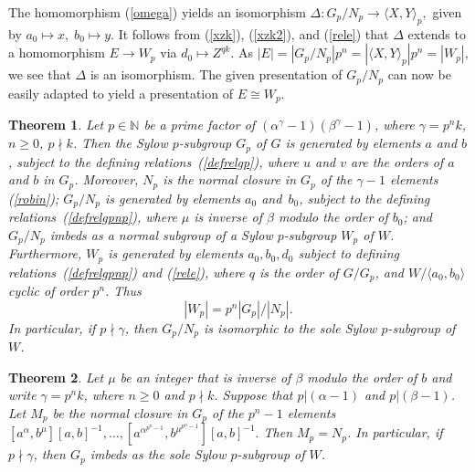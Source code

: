 \documentclass{amsart}
\newtheorem{theorem}{Theorem}[section]
\theoremstyle{definition}
\theoremstyle{remark}
\newcommand \N{{\mathbb N}}
\begin{document}
The homomorphism (\ref{omega}) yields an isomorphism
$
\Delta:G_p/N_p\to \langle X,Y\rangle_p,
$
given by
$
a_0\mapsto x,\; b_0\mapsto y.
$
It follows from (\ref{xzk}), (\ref{xzk2}), and (\ref{rele}) that $\Delta$
extends to a homomorphism $E\to W_p$ via $d_0\mapsto Z^{qk}$. As $|E|=|G_p/N_p|p^n=|\langle X,Y\rangle_p|p^n=|W_p|$,
we see that $\Delta$ is an isomorphism. The given presentation of $G_p/N_p$ can now be easily
adapted to yield a presentation of $E\cong W_p$. 

\begin{theorem}\label{dos} Let $p\in\N$ be a prime factor of $(\alpha^\gamma-1)(\beta^\gamma-1)$, where
$\gamma=p^n k$, $n\geq 0$, $p\nmid k$. Then the Sylow $p$-subgroup $G_p$ of $G$ is generated
by elements $a$ and $b$, subject to the defining relations~(\ref{defrelgp}), where
$u$ and $v$ are the orders of $a$ and  $b$ in $G_p$. Moreover, $N_p$ is the normal closure
in $G_p$ of the $\gamma-1$ elements (\ref{robin}); $G_p/N_p$ is generated
by elements $a_0$ and~$b_0$, subject to the defining relations~(\ref{defrelgpnp}), 
where $\mu$ is inverse of $\beta$ modulo the order of $b_0$; and $G_p/N_p$ imbeds as a normal subgroup of 
a Sylow $p$-subgroup $W_p$ of $W$.
Furthermore, $W_p$ is generated by elements 
$a_0,b_0,d_0$ subject to defining relations~(\ref{defrelgpnp}) and (\ref{rele}), where 
$q$ is the order of $G/G_p$,  and $W/\langle a_0,b_0\rangle$ cyclic 
of order $p^n$. Thus
$$
|W_p|=p^n |G_p|/|N_p|.
$$
In particular, if $p\nmid \gamma$, then $G_p/N_p$ is isomorphic to the sole Sylow $p$-subgroup of $W$.
\end{theorem}



\begin{theorem}\label{tres} Let $\mu$ be an integer that is inverse of $\beta$ modulo the order of $b$ and write $\gamma=p^n k$,
where $n\geq 0$ and $p\nmid k$. Suppose that $p|(\alpha-1)$ and $p|(\beta-1)$. Let $M_p$ be
 the normal closure in $G_p$ of the $p^n-1$ elements
$
[a^\alpha,b^\mu][a,b]^{-1},\dots, [a^{\alpha^{p^n-1}},b^{\mu^{p^n-1}}][a,b]^{-1}.
$
Then $M_p=N_p$. In particular, if  $p\nmid \gamma$, then $G_p$ imbeds as the sole Sylow $p$-subgroup of $W$.
\end{theorem}
\end{document}
